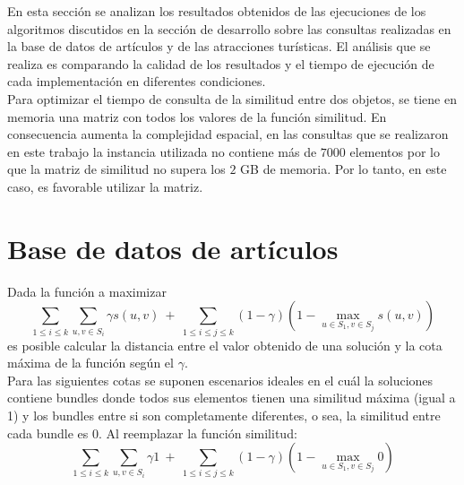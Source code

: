 En esta sección se analizan los resultados obtenidos de las ejecuciones de los algoritmos discutidos en la sección de desarrollo sobre las consultas realizadas en la base de datos de artículos y de las atracciones turísticas. El análisis que se realiza es comparando la calidad de los resultados y el tiempo de ejecución de cada implementación en diferentes condiciones.\\

Para optimizar el tiempo de consulta de la similitud entre dos objetos, se tiene en memoria una matriz con todos los valores de la función similitud. En consecuencia aumenta la complejidad espacial, en las consultas que se realizaron en este trabajo la instancia utilizada no contiene más de $7000$ elementos por lo que la matriz de similitud no supera los $2$ GB de memoria. Por lo tanto, en este caso, es favorable utilizar la matriz.\\

\section{Base de datos de artículos}
Dada la función a maximizar $$\displaystyle\sum_{1 \leq i \leq k} \displaystyle\sum_{u,v \in S_{i}} \gamma s(u,v)\ +\ \displaystyle\sum_{1 \leq i \leq j \leq k} (1-\gamma) (1 - \displaystyle\max_{u \in S_{1}, v \in S_{j}} s(u,v))$$ es posible calcular la distancia entre el valor obtenido de una solución y la cota máxima de la función según el $\gamma$.\\

Para las siguientes cotas se suponen escenarios ideales en el cuál la soluciones contiene bundles donde todos sus elementos tienen una similitud máxima (igual a 1) y los bundles entre si son completamente diferentes, o sea, la similitud entre cada bundle es 0. Al reemplazar la función similitud:
$$\displaystyle\sum_{1 \leq i \leq k} \displaystyle\sum_{u,v \in S_{i}} \gamma 1\ +\ \displaystyle\sum_{1 \leq i \leq j \leq k} (1-\gamma) (1 - \displaystyle\max_{u \in S_{1}, v \in S_{j}} 0)$$ 

